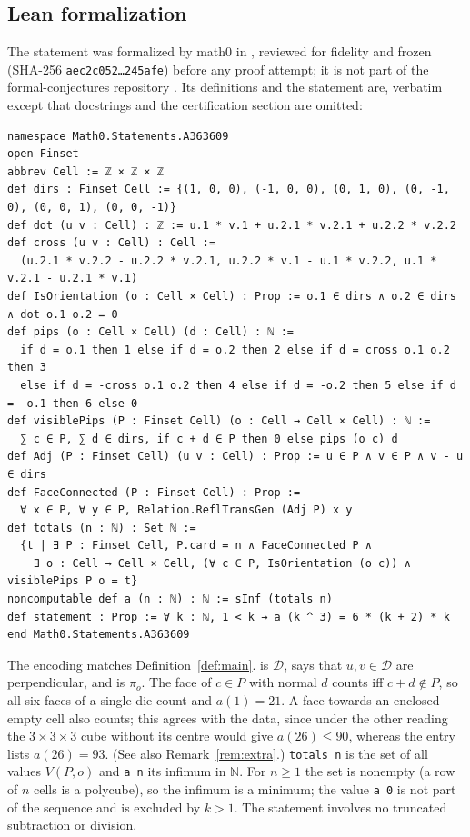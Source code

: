 \documentclass[11pt]{amsart}
\theoremstyle{plain}
\theoremstyle{definition}
\newcommand{\N}{\mathbb{N}}
\newcommand{\D}{\mathcal{D}}
\begin{document}
\subsection*{Lean formalization}
The statement was formalized by math0 in , reviewed for fidelity and frozen (SHA-256 \texttt{aec2c052\ldots 245afe}) before any proof attempt; it is not part of the formal-conjectures repository \cite{FC}. Its definitions and the statement are, verbatim except that docstrings and the certification section are omitted:
\begin{lstlisting}
namespace Math0.Statements.A363609
open Finset
abbrev Cell := ℤ × ℤ × ℤ
def dirs : Finset Cell := {(1, 0, 0), (-1, 0, 0), (0, 1, 0), (0, -1, 0), (0, 0, 1), (0, 0, -1)}
def dot (u v : Cell) : ℤ := u.1 * v.1 + u.2.1 * v.2.1 + u.2.2 * v.2.2
def cross (u v : Cell) : Cell :=
  (u.2.1 * v.2.2 - u.2.2 * v.2.1, u.2.2 * v.1 - u.1 * v.2.2, u.1 * v.2.1 - u.2.1 * v.1)
def IsOrientation (o : Cell × Cell) : Prop := o.1 ∈ dirs ∧ o.2 ∈ dirs ∧ dot o.1 o.2 = 0
def pips (o : Cell × Cell) (d : Cell) : ℕ :=
  if d = o.1 then 1 else if d = o.2 then 2 else if d = cross o.1 o.2 then 3
  else if d = -cross o.1 o.2 then 4 else if d = -o.2 then 5 else if d = -o.1 then 6 else 0
def visiblePips (P : Finset Cell) (o : Cell → Cell × Cell) : ℕ :=
  ∑ c ∈ P, ∑ d ∈ dirs, if c + d ∈ P then 0 else pips (o c) d
def Adj (P : Finset Cell) (u v : Cell) : Prop := u ∈ P ∧ v ∈ P ∧ v - u ∈ dirs
def FaceConnected (P : Finset Cell) : Prop :=
  ∀ x ∈ P, ∀ y ∈ P, Relation.ReflTransGen (Adj P) x y
def totals (n : ℕ) : Set ℕ :=
  {t | ∃ P : Finset Cell, P.card = n ∧ FaceConnected P ∧
    ∃ o : Cell → Cell × Cell, (∀ c ∈ P, IsOrientation (o c)) ∧ visiblePips P o = t}
noncomputable def a (n : ℕ) : ℕ := sInf (totals n)
def statement : Prop := ∀ k : ℕ, 1 < k → a (k ^ 3) = 6 * (k + 2) * k
end Math0.Statements.A363609
\end{lstlisting}
The encoding matches Definition~\ref{def:main}.  is $\D$,  says that $u,v\in\D$ are perpendicular, and  is $\pi_o$. The face of $c\in P$ with normal $d$ counts iff $c+d\notin P$, so all six faces of a single die count and $a(1)=21$. A face towards an enclosed empty cell also counts; this agrees with the data, since under the other reading the $3\times3\times3$ cube without its centre would give $a(26)\le90$, whereas the entry lists $a(26)=93$. (See also Remark~\ref{rem:extra}.) \texttt{totals n} is the set of all values $V(P,o)$ and \texttt{a n} its infimum in $\N$. For $n\ge1$ the set is nonempty (a row of $n$ cells is a polycube), so the infimum is a minimum; the value \texttt{a 0} is not part of the sequence and is excluded by $k>1$. The statement involves no truncated subtraction or division.
\end{document}
